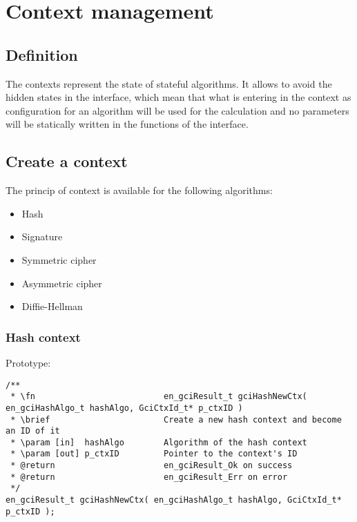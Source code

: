 \chapter{Context management}

\section{Definition}

The contexts represent the state of stateful algorithms. It allows to avoid the
hidden states in the interface, which mean that what is entering in the context
as configuration for an algorithm will be used for the calculation and no
parameters will be statically written in the functions of the interface.


\section{Create a context}
The princip of context is available for the following algorithms:
\begin{itemize}
  \item Hash
  \item Signature
  \item Symmetric cipher
  \item Asymmetric cipher
  \item Diffie-Hellman
\end{itemize}


\newpage



\subsection{Hash context}
\label{hashCtx}

Prototype:

\begin{lstlisting}
/**
 * \fn							en_gciResult_t gciHashNewCtx( en_gciHashAlgo_t hashAlgo, GciCtxId_t* p_ctxID )
 * \brief						Create a new hash context and become an ID of it
 * \param [in]  hashAlgo 		Algorithm of the hash context
 * \param [out] p_ctxID			Pointer to the context's ID
 * @return						en_gciResult_Ok on success
 * @return						en_gciResult_Err on error
 */
en_gciResult_t gciHashNewCtx( en_gciHashAlgo_t hashAlgo, GciCtxId_t* p_ctxID );
\end{lstlisting}

